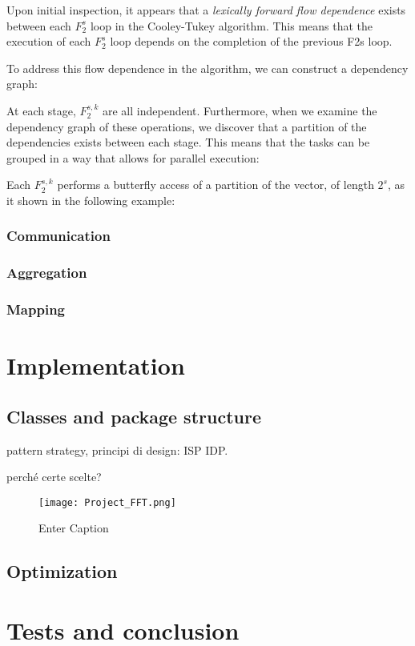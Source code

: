 \documentclass[12pt]{article}
\begin{document}
\noindent Upon initial inspection, it appears that a \textit{lexically forward flow dependence} exists between each $F_2^s$ loop in the Cooley-Tukey algorithm. This means that the execution of each $F_2^s$ loop depends on the completion of the previous F2s loop.

\noindent To address this flow dependence in the algorithm, we can construct a dependency graph:
\pagebreak


\bigskip

At each stage, $F^{s,k}_2$ are all independent. Furthermore, when we examine the dependency graph of these operations, we discover that a partition of the dependencies exists between each stage. This means that the tasks can be grouped in a way that allows for parallel execution: 
\bigskip


\bigskip

Each $F^{s,k}_2$ performs a butterfly access of a partition of the vector, of length $2^s$, as it shown in the following example:

\bigskip




\subsubsection{Communication}
\subsubsection{Aggregation}





\subsubsection{Mapping}

\section{Implementation}

\subsection{Classes and package structure}
pattern strategy, principi di design: ISP IDP. 

perché certe scelte?

\begin{figure}[h!]
    \centering
    \texttt{[image: Project\_FFT.png]}
    \caption{Enter Caption}
    
\end{figure}

\subsection{Optimization}

\section{Tests and conclusion}
\end{document}
